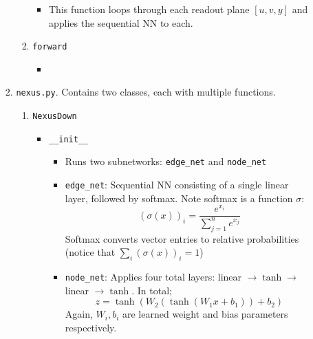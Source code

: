 \begin{itemize}
\begin{enumerate}
\begin{enumerate}
\begin{enumerate}
\begin{itemize}
                                \item This function loops through each readout plane $[u, v, y]$ and applies the sequential NN to each.
                            \end{itemize}
                            
                            \item \texttt{forward}
                            \begin{itemize}
                                \item
                            \end{itemize}

                        \end{enumerate}

                    \item \texttt{nexus.py}. Contains two classes, each with multiple functions.
                        \begin{enumerate}
                            \item \texttt{NexusDown}
                                \begin{itemize} 
                                    \item \texttt{\_\_init\_\_}
                                        \begin{itemize}
                                            \item Runs two subnetworks: \texttt{edge\_net} and \texttt{node\_net}

                                            \item \texttt{edge\_net}: Sequential NN consisting of a single linear layer, followed by softmax. Note softmax is a function $\sigma$:
                                            \begin{equation}
                                                (\sigma(x))_i = \frac{e^{x_i}}{\sum_{j=1}^n e^{x_j}}
                                            \end{equation}
                                            Softmax converts vector entries to relative probabilities (notice that $\sum_i (\sigma(x))_i = 1$)

                                            \item \texttt{node\_net}: Applies four total layers: linear $\to \tanh \to$ linear $\to \tanh$. In total;
                                            \begin{equation}
                                                z = \tanh\left(W_2\left(\tanh\left(W_1x + b_1\right)\right) + b_2\right)
                                            \end{equation}
                                            Again, $W_i, b_i$ are learned weight and bias parameters respectively.
                                        \end{itemize}


\end{itemize}
\end{enumerate}
\end{enumerate}
\end{enumerate}
\end{itemize}
